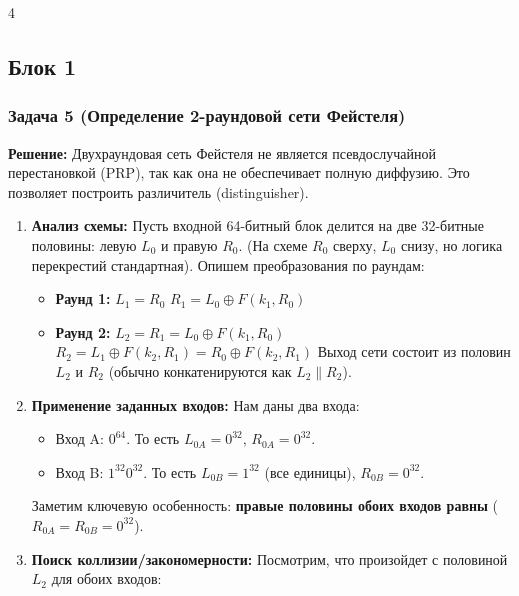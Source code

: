 ﻿\documentclass[8pt,a4paper,landscape]{extarticle}
\newcommand{\tightlist}{}
\begin{document}
\begin{multicols*}{4}

\subsection{Блок 1}\label{ux431ux43bux43eux43a-1}

\subsubsection{Задача 5 (Определение 2-раундовой сети Фейстеля)}\label{ux437ux430ux434ux430ux447ux430-5-ux43eux43fux440ux435ux434ux435ux43bux435ux43dux438ux435-2-ux440ux430ux443ux43dux434ux43eux432ux43eux439-ux441ux435ux442ux438-ux444ux435ux439ux441ux442ux435ux43bux44f}

\textbf{Решение:} Двухраундовая сеть Фейстеля не является псевдослучайной перестановкой (PRP), так как она не обеспечивает полную диффузию. Это позволяет построить различитель (distinguisher).

\begin{enumerate}
\def\labelenumi{\arabic{enumi}.}
\item
  \textbf{Анализ схемы:} Пусть входной 64-битный блок делится на две 32-битные половины: левую \(L_0\) и правую \(R_0\). (На схеме \(R_0\) сверху, \(L_0\) снизу, но логика перекрестий стандартная). Опишем преобразования по раундам:

  \begin{itemize}
  \tightlist
  \item
    \textbf{Раунд 1:} \(L_1 = R_0\) \(R_1 = L_0 \oplus F(k_1, R_0)\)
  \item
    \textbf{Раунд 2:} \(L_2 = R_1 = L_0 \oplus F(k_1, R_0)\) \(R_2 = L_1 \oplus F(k_2, R_1) = R_0 \oplus F(k_2, R_1)\) Выход сети состоит из половин \(L_2\) и \(R_2\) (обычно конкатенируются как \(L_2 \parallel R_2\)).
  \end{itemize}
\item
  \textbf{Применение заданных входов:} Нам даны два входа:

  \begin{itemize}
  \tightlist
  \item
    Вход A: \(0^{64}\). То есть \(L_{0A} = 0^{32}\), \(R_{0A} = 0^{32}\).
  \item
    Вход B: \(1^{32}0^{32}\). То есть \(L_{0B} = 1^{32}\) (все единицы), \(R_{0B} = 0^{32}\).
  \end{itemize}

  Заметим ключевую особенность: \textbf{правые половины обоих входов равны} (\(R_{0A} = R_{0B} = 0^{32}\)).
\item
  \textbf{Поиск коллизии/закономерности:} Посмотрим, что произойдет с половиной \(L_2\) для обоих входов:


\end{enumerate}
\end{multicols*}
\end{document}
